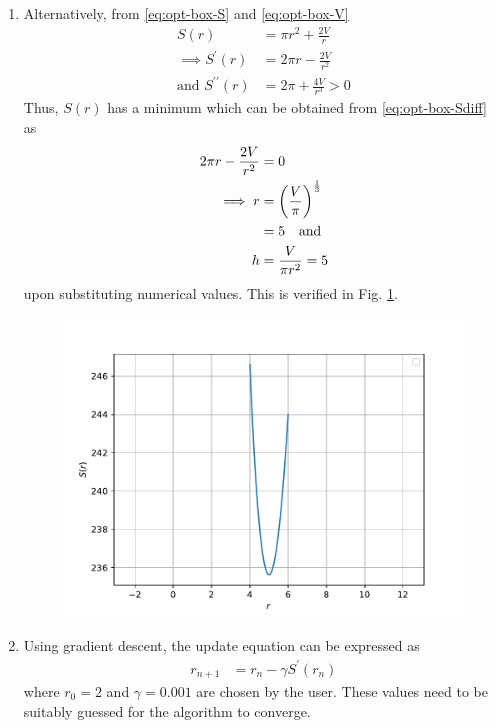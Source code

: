 \documentclass[journal,12pt,twocolumn]{IEEEtran}
\renewcommand\thesection{\arabic{section}}
\begin{document}
\begin{enumerate}[label=\thesection.\arabic*.,ref=\thesection.\theenumi]
\begin{enumerate}
	\item 
		Alternatively, from 
			\eqref{eq:opt-box-S} and 
			\eqref{eq:opt-box-V}
		\begin{align}
			S(r) &= \pi r^2 +  \frac{2 V}{r} 
			\\
			\label{eq:opt-box-Sdiff}
			\implies 
			S^{\prime}(r) &= 2\pi r -  \frac{2 V}{r^2} 
			\\
			\text{and }
			S^{\prime\prime}(r) &= 2\pi  +  \frac{4 V}{r^3} > 0 
		\end{align}
		Thus, $S(r)$ has a minimum which can be obtained from 
			\eqref{eq:opt-box-Sdiff} as
		\begin{align}
			2\pi r -  \frac{2 V}{r^2} &= 0
			\\
			\implies r &= \left(\frac{V}{\pi}\right)^{\frac{1}{3}}
			\\
			&= 5 \quad \text{and }
			\\
			h &= \frac{V}{\pi r^2} = 5
		\end{align}
		upon substituting numerical values.
		This is verified in 
Fig. 
	\ref{fig:opt-12-3}.
\begin{figure}[!h]
	\centering
	\includegraphics[width=\columnwidth]{figs/opt-12-3.pdf}
	\caption{}
	\label{fig:opt-12-3}
\end{figure}
	\item Using gradient descent, the update equation can be expressed as 
		\begin{align}
			r_{n+1} &= r_n - \gamma S^{\prime}(r_n)
		\end{align}
		where $r_0 = 2$ and $\gamma = 0.001$ are chosen by the user.  These values need to be suitably guessed for the algorithm to converge.


\end{enumerate}
\end{enumerate}
\end{document}
